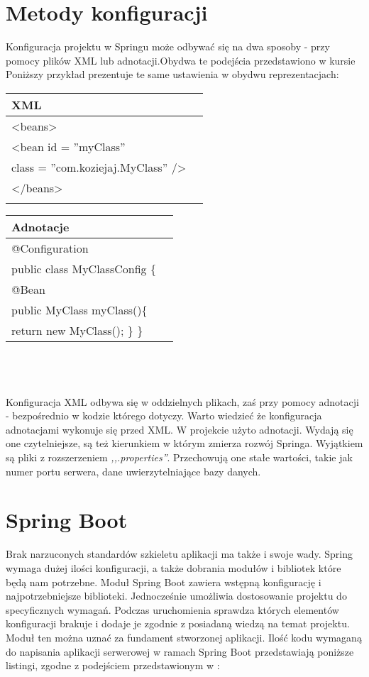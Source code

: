 \documentclass[a4paper,12pt,twoside,openany]{report}
\begin{document}
\section{Metody konfiguracji}
Konfiguracja projektu w Springu może odbywać się na dwa sposoby - przy pomocy plików XML lub adnotacji.Obydwa te podejścia przedstawiono w kursie \cite{Spring2}  Poniższy przykład prezentuje te same ustawienia w obydwu reprezentacjach:\\
\begin{tabular}{|l|l|}
	\hline XML\\ 
	\hline <beans> \\
	<bean id = ''myClass'' \\ class = ''com.koziejaj.MyClass'' />\\
	</beans>\\ \\
	\hline 
\end{tabular} 
\begin{tabular}{|l|l|}
	\hline Adnotacje\\ 
	\hline @Configuration\\
	public class MyClassConfig \{\\
	@Bean \\
	public MyClass myClass()\{\\
	return new MyClass();
	\}
	\}\\
	\hline 
\end{tabular}\\\\\\
Konfiguracja XML odbywa się w oddzielnych plikach, zaś przy pomocy adnotacji - bezpośrednio w kodzie którego dotyczy. Warto wiedzieć że konfiguracja adnotacjami wykonuje się przed XML. W projekcie użyto adnotacji. Wydają się one czytelniejsze, są też kierunkiem w którym zmierza rozwój Springa. Wyjątkiem są pliki z rozszerzeniem \textit{,,.properties''}. Przechowują one stałe wartości, takie jak numer portu serwera, dane uwierzytelniające bazy danych.
\section{Spring Boot}
Brak narzuconych standardów szkieletu aplikacji ma także i swoje wady. Spring wymaga dużej ilości konfiguracji, a także dobrania modułów i bibliotek które będą nam potrzebne. Moduł Spring Boot zawiera wstępną konfigurację i najpotrzebniejsze biblioteki. Jednocześnie umożliwia dostosowanie projektu do specyficznych wymagań. Podczas uruchomienia sprawdza których elementów konfiguracji brakuje i dodaje je zgodnie z posiadaną wiedzą na temat projektu. Moduł ten można uznać za fundament stworzonej aplikacji. Ilość kodu wymaganą do napisania aplikacji serwerowej w ramach Spring Boot przedstawiają poniższe listingi, zgodne z podejściem przedstawionym w \cite{Spring}:
\end{document}
